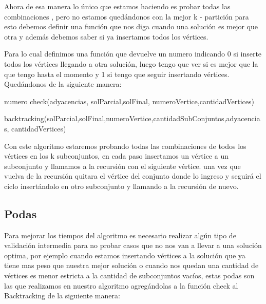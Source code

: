 Ahora de esa manera lo único que estamos haciendo es probar todas las combinaciones , pero no estamos quedándonos con la mejor k - partición para esto debemos definir una función que nos diga cuando una solución es mejor que otra y además debemos saber si ya insertamos todos los vértices.

Para lo cual definimos una función que devuelve un numero indicando 0 si inserte todos los vértices llegando a otra solución, luego tengo que ver si es mejor que la que tengo hasta el momento y 1 si tengo que seguir insertando vértices.
Quedándonos de la siguiente manera:

\begin{algorithm}
  \begin{algorithmic}[1]\parskip=1mm
 \caption{numero check(adyacencias, solParcial,solFinal, numeroVertice,cantidadVertices)}
  \end{algorithmic}
  \end{algorithm}
    
\begin{algorithm}
  \begin{algorithmic}[1]\parskip=1mm
 \caption{backtracking(solParcial,solFinal,numeroVertice,cantidadSubConjuntos,adyacencias, cantidadVertices)}

  \end{algorithmic}
  \end{algorithm}

Con este algoritmo estaremos probando todas las combinaciones de todos los vértices en los k subconjuntos, en cada paso insertamos un vértice a un subconjunto y llamamos a la recursión con el siguiente vértice. una vez que vuelva de la recursión quitara el vértice del conjunto donde lo ingreso y seguirá el ciclo insertándolo en otro subconjunto y llamando a la recursión de nuevo.

\subsection{Podas}
Para mejorar los tiempos del algoritmo es necesario realizar algún tipo de validación intermedia para no probar casos que no nos van a llevar a una solución optima, por ejemplo cuando estamos insertando vértices a la solución que ya tiene mas peso que nuestra mejor solución o cuando nos quedan una cantidad de vértices es menor estricta a la cantidad de subconjuntos vacíos, estas podas son las que realizamos en nuestro algoritmo agregándolas a la función check al Backtracking de la siguiente manera:

